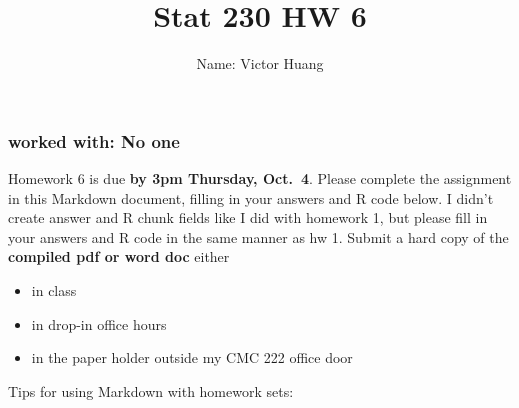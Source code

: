 \documentclass[
]{article}
\title{Stat 230 HW 6}
\author{Name: Victor Huang}
\date{}
\providecommand{\tightlist}{%
  \setlength{\itemsep}{0pt}\setlength{\parskip}{0pt}}
\begin{document}
\maketitle

\hypertarget{worked-with-no-one}{%
\subsubsection{worked with: No one}\label{worked-with-no-one}}

Homework 6 is due \textbf{by 3pm Thursday, Oct.~4}. Please complete the
assignment in this Markdown document, filling in your answers and R code
below. I didn't create answer and R chunk fields like I did with
homework 1, but please fill in your answers and R code in the same
manner as hw 1. Submit a hard copy of the \textbf{compiled pdf or word
doc} either

\begin{itemize}
\tightlist
\item
  in class
\item
  in drop-in office hours
\item
  in the paper holder outside my CMC 222 office door
\end{itemize}

Tips for using Markdown with homework sets:
\end{document}

